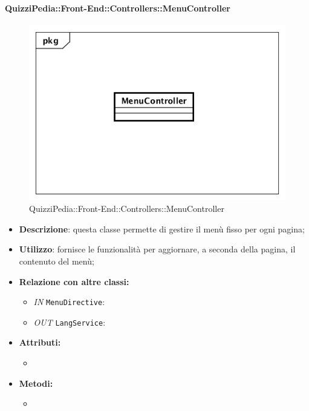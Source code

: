 \paragraph{QuizziPedia::Front-End::Controllers::MenuController}
\begin{figure}
	\centering
	\includegraphics[scale=0.45]{UML/Classi/Front-End/QuizziPedia_Front-end_Controller_MenuController.png}
	\caption{QuizziPedia::Front-End::Controllers::MenuController}
\end{figure}
\begin{itemize}
	\item \textbf{Descrizione}: questa classe permette di gestire il menù fisso per ogni pagina;
	\item \textbf{Utilizzo}: fornisce le funzionalità per aggiornare, a seconda della pagina, il contenuto del menù;
	\item \textbf{Relazione con altre classi:}
	\begin{itemize}
		\item \textit{IN} \texttt{MenuDirective}:  
		\item \textit{OUT} \texttt{LangService}: 
	\end{itemize}
	\item \textbf{Attributi:}
	\begin{itemize}
		\item 
	\end{itemize}
	\item \textbf{Metodi:}
	\begin{itemize}
		\item 
	\end{itemize}
\end{itemize}

